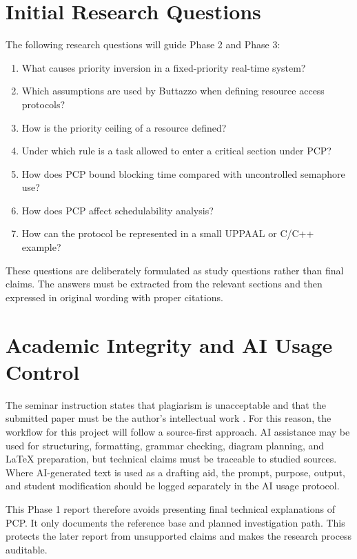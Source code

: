 \documentclass[conference]{IEEEtran}
\begin{document}
\section{Initial Research Questions}
The following research questions will guide Phase 2 and Phase 3:
\begin{enumerate}
    \item What causes priority inversion in a fixed-priority real-time system?
    \item Which assumptions are used by Buttazzo when defining resource access protocols?
    \item How is the priority ceiling of a resource defined?
    \item Under which rule is a task allowed to enter a critical section under PCP?
    \item How does PCP bound blocking time compared with uncontrolled semaphore use?
    \item How does PCP affect schedulability analysis?
    \item How can the protocol be represented in a small UPPAAL or C/C++ example?
\end{enumerate}

These questions are deliberately formulated as study questions rather than final claims. The answers must be extracted from the relevant sections and then expressed in original wording with proper citations.

\section{Academic Integrity and AI Usage Control}
The seminar instruction states that plagiarism is unacceptable and that the submitted paper must be the author's intellectual work \cite{HenklerSeminar2026}. For this reason, the workflow for this project will follow a source-first approach. AI assistance may be used for structuring, formatting, grammar checking, diagram planning, and LaTeX preparation, but technical claims must be traceable to studied sources. Where AI-generated text is used as a drafting aid, the prompt, purpose, output, and student modification should be logged separately in the AI usage protocol.

This Phase 1 report therefore avoids presenting final technical explanations of PCP. It only documents the reference base and planned investigation path. This protects the later report from unsupported claims and makes the research process auditable.
\end{document}
